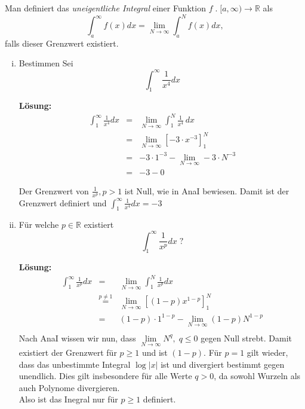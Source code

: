 \documentclass[11pt,a4paper,ngerman]{article}
\begin{document}
Man definiert das \emph{uneigentliche Integral} einer Funktion $f \; . \; [a,\infty) \rightarrow \mathbb{R}$ als
$$
\int_a^\infty f(x)dx = \lim_{N\rightarrow \infty} \int_a^N f(x)dx,
$$
falls dieser Grenzwert existiert.
\begin{enumerate}[(i)]
	\item Bestimmen Sei
		$$
			\int_1^\infty \frac{1}{x^4} dx
		$$
	
	\textbf{Lösung:}\\
	
	$$\begin{array}{rcl}
		\int_1^\infty \frac{1}{x^4} dx &=& \underset{{N\rightarrow \infty}}{\lim} \int_1^N \frac{1}{x^4} \, dx\\
			&=& \underset{{N\rightarrow \infty}}{\lim} \left[ -3 \cdot x^{-3} \right]_1^N\\
			&=& -3 \cdot 1^{-3} - \underset{{N\rightarrow \infty}}{\lim} - 3 \cdot N^{-3}\\
			&=& -3 - 0  
	\end{array}$$

	Der Grenzwert von $\frac{1}{x^p}, p>1$ ist Null, wie in AnaI bewiesen. Damit ist der Grenzwert definiert und $\int_1^\infty \frac{1}{x^4} dx = -3$

	\item Für welche $p\in\mathbb{R}$ existiert
		$$
			\int_1^\infty \frac{1}{x^p}dx \; ?
		$$

	\textbf{Lösung:}\\
		$$\begin{array}{rcl}
			\int_1^\infty \frac{1}{x^p}dx &=& \underset{{N\rightarrow \infty}}{\lim} \int_1^N \frac{1}{x^p}dx\\
				&\stackrel{p\not=1}{=}& \underset{{N\rightarrow \infty}}{\lim} \left[ (1-p)x^{1-p}\right]_1^N\\
				&=& (1-p)\cdot1^{1-p} -\underset{{N\rightarrow \infty}}{\lim} (1-p)N^{1-p}\\
		\end{array}$$
		Nach AnaI wissen wir nun, dass $\underset{{N\rightarrow \infty}}{\lim} N^q, \; q\leq0$ gegen Null strebt. Damit existiert der Grenzwert für 			$p \geq 1$ und ist $(1-p)$. Für $p=1$ gilt wieder, dass das unbestimmte Integral $\log |x|$ ist und divergiert bestimmt gegen unendlich. Dies gilt 
		insbesondere für alle Werte $q>0$, da sowohl Wurzeln als auch Polynome divergieren.\\
		Also ist das Inegral nur für $p\geq1$ definiert.
\end{enumerate}
\end{document}
